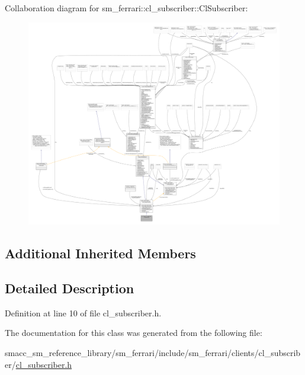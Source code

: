 Collaboration diagram for sm\+\_\+ferrari\+:\+:cl\+\_\+subscriber\+:\+:Cl\+Subscriber\+:
\nopagebreak
\begin{figure}[H]
\begin{center}
\leavevmode
\includegraphics[width=350pt]{classsm__ferrari_1_1cl__subscriber_1_1ClSubscriber__coll__graph}
\end{center}
\end{figure}
\subsection*{Additional Inherited Members}


\subsection{Detailed Description}


Definition at line 10 of file cl\+\_\+subscriber.\+h.



The documentation for this class was generated from the following file\+:\begin{DoxyCompactItemize}
\item 
smacc\+\_\+sm\+\_\+reference\+\_\+library/sm\+\_\+ferrari/include/sm\+\_\+ferrari/clients/cl\+\_\+subscriber/\hyperlink{sm__ferrari_2include_2sm__ferrari_2clients_2cl__subscriber_2cl__subscriber_8h}{cl\+\_\+subscriber.\+h}\end{DoxyCompactItemize}
